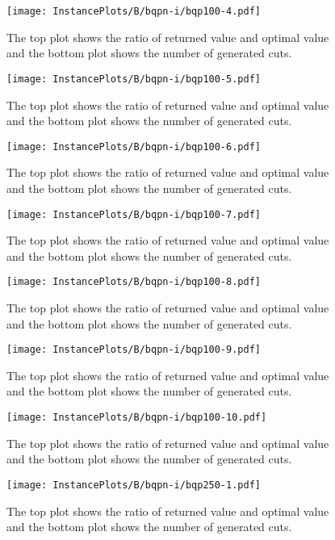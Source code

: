 \documentclass[10pt,a4paper]{article}
\begin{document}
\begin{figure}[H]
\texttt{[image: InstancePlots/B/bqpn-i/bqp100-4.pdf]}
\caption{The top plot shows the ratio of returned value and optimal value     and the bottom plot shows the number of generated cuts.}
\end{figure}

\begin{figure}[H]
\texttt{[image: InstancePlots/B/bqpn-i/bqp100-5.pdf]}
\caption{The top plot shows the ratio of returned value and optimal value     and the bottom plot shows the number of generated cuts.}
\end{figure}

\begin{figure}[H]
\texttt{[image: InstancePlots/B/bqpn-i/bqp100-6.pdf]}
\caption{The top plot shows the ratio of returned value and optimal value     and the bottom plot shows the number of generated cuts.}
\end{figure}

\begin{figure}[H]
\texttt{[image: InstancePlots/B/bqpn-i/bqp100-7.pdf]}
\caption{The top plot shows the ratio of returned value and optimal value     and the bottom plot shows the number of generated cuts.}
\end{figure}

\begin{figure}[H]
\texttt{[image: InstancePlots/B/bqpn-i/bqp100-8.pdf]}
\caption{The top plot shows the ratio of returned value and optimal value     and the bottom plot shows the number of generated cuts.}
\end{figure}

\begin{figure}[H]
\texttt{[image: InstancePlots/B/bqpn-i/bqp100-9.pdf]}
\caption{The top plot shows the ratio of returned value and optimal value     and the bottom plot shows the number of generated cuts.}
\end{figure}

\begin{figure}[H]
\texttt{[image: InstancePlots/B/bqpn-i/bqp100-10.pdf]}
\caption{The top plot shows the ratio of returned value and optimal value     and the bottom plot shows the number of generated cuts.}
\end{figure}

\begin{figure}[H]
\texttt{[image: InstancePlots/B/bqpn-i/bqp250-1.pdf]}
\caption{The top plot shows the ratio of returned value and optimal value     and the bottom plot shows the number of generated cuts.}
\end{figure}
\end{document}
